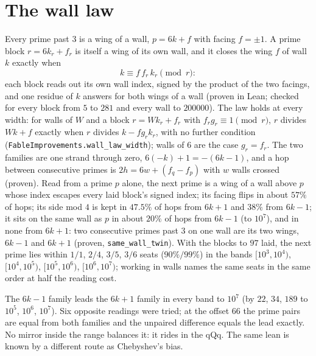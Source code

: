 \documentclass[11pt]{article}
\begin{document}
\section{The wall law}
Every prime past $3$ is a wing of a wall, $p = 6k+f$ with facing $f = \pm1$. A prime block $r = 6k_r + f_r$ is itself a wing of its own wall, and it closes the wing $f$ of wall $k$ exactly when
\[ k \equiv f\, f_r\, k_r \pmod r: \]
each block reads out its own wall index, signed by the product of the two facings, and one residue of $k$ answers for both wings of a wall (proven in Lean; checked for every block from $5$ to $281$ and every wall to $200000$). The law holds at every width: for walls of $W$ and a block $r = W k_r + f_r$ with $f_r g_r \equiv 1 \pmod r$, $r$ divides $Wk+f$ exactly when $r$ divides $k - f g_r k_r$, with no further condition (\texttt{FableImprovements.wall\_law\_width}); walls of $6$ are the case $g_r = f_r$. The two families are one strand through zero, $6(-k)+1 = -(6k-1)$, and a hop between consecutive primes is $2h = 6w + (f_q - f_p)$ with $w$ walls crossed (proven). Read from a prime $p$ alone, the next prime is a wing of a wall above $p$ whose index escapes every laid block's signed index; its facing flips in about $57\%$ of hops; its side mod $4$ is kept in $47.5\%$ of hops from $6k+1$ and $38\%$ from $6k-1$; it sits on the same wall as $p$ in about $20\%$ of hops from $6k-1$ (to $10^7$), and in none from $6k+1$: two consecutive primes past $3$ on one wall are its two wings, $6k-1$ and $6k+1$ (proven, \texttt{same\_wall\_twin}). With the blocks to $97$ laid, the next prime lies within $1/1$, $2/4$, $3/5$, $3/6$ seats ($90\%/99\%$) in the bands $[10^3,10^4)$, $[10^4,10^5)$, $[10^5,10^6)$, $[10^6,10^7)$; working in walls names the same seats in the same order at half the reading cost.

The $6k-1$ family leads the $6k+1$ family in every band to $10^7$ (by $22$, $34$, $189$ to $10^5$, $10^6$, $10^7$). Six opposite readings were tried; at the offset $66$ the prime pairs are equal from both families and the unpaired difference equals the lead exactly. No mirror inside the range balances it: it rides in the qQq. The same lean is known by a different route as Chebyshev's bias.
\end{document}
